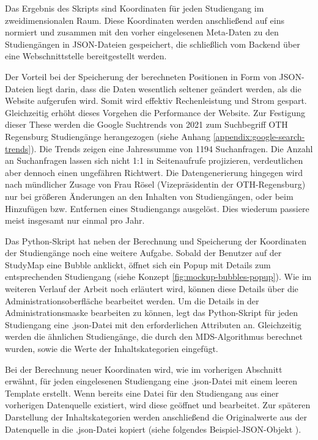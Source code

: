 Das Ergebnis des Skripts sind Koordinaten für jeden Studiengang im zweidimensionalen Raum. Diese Koordinaten werden anschließend auf eins normiert und zusammen mit den vorher eingelesenen Meta-Daten zu den Studiengängen in JSON-Dateien gespeichert, die schließlich vom Backend über eine Webschnittstelle bereitgestellt werden.

Der Vorteil bei der Speicherung der berechneten Positionen in Form von
JSON-Dateien liegt darin, dass die Daten wesentlich seltener geändert werden,
als die Website aufgerufen wird. Somit wird effektiv Rechenleistung und Strom
gespart. Gleichzeitig erhöht
dieses Vorgehen die Performance der Website. Zur Festigung dieser These werden
die Google Suchtrends von 2021 zum Suchbegriff \glqq OTH Regensburg
Studiengänge\grqq{} herangezogen (siehe Anhang
\ref{appendix:google-search-trends}). Die Trends zeigen eine Jahressumme von
1194 Suchanfragen. Die Anzahl an Suchanfragen lassen sich nicht 1:1 in
Seitenaufrufe projizieren, verdeutlichen aber dennoch einen ungefähren
Richtwert. Die Datengenerierung hingegen wird nach mündlicher Zusage von
Frau Rösel (Vizepräsidentin der OTH-Regensburg) nur bei größeren Änderungen an den
Inhalten von Studiengängen, oder beim Hinzufügen bzw. Entfernen eines 
Studiengangs ausgelöst. Dies wiederum passiere meist insgesamt nur einmal pro
Jahr.

Das Python-Skript hat neben der Berechnung und Speicherung der Koordinaten der Studiengänge noch eine weitere Aufgabe. Sobald der Benutzer auf der StudyMap eine Bubble anklickt, öffnet sich ein Popup mit Details zum entsprechenden Studiengang (siehe Konzept \autoref{fig:mockup-bubbles-popup}). Wie im weiteren Verlauf der Arbeit noch erläutert wird, können diese Details über die Administrationsoberfläche bearbeitet werden. Um die Details in der Administrationsmaske bearbeiten zu können, legt das Python-Skript für jeden Studiengang eine .json-Datei mit den erforderlichen Attributen an. Gleichzeitig werden die ähnlichen Studiengänge, die durch den MDS-Algorithmus berechnet wurden, sowie die Werte der Inhaltskategorien eingefügt.

Bei der Berechnung neuer Koordinaten wird, wie im vorherigen Abschnitt erwähnt, für jeden eingelesenen Studiengang eine .json-Datei mit einem leeren Template erstellt. Wenn bereits eine Datei für den Studiengang aus einer vorherigen Datenquelle existiert, wird diese geöffnet und bearbeitet. Zur späteren Darstellung der Inhaltskategorien werden anschließend die Originalwerte aus der Datenquelle in die .json-Datei kopiert (siehe folgendes Beispiel-JSON-Objekt ).

